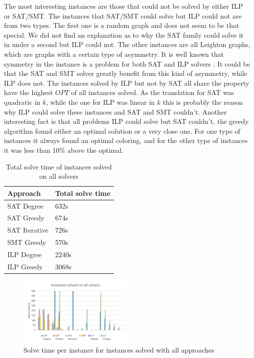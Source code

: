 \documentclass{sig-alternate}
\begin{document}
The most interesting instances are those that could not be solved by either ILP or SAT/SMT. 
The instances that SAT/SMT could solve but ILP could not are from two types.
The first one is a random graph and does not seem to be that special.
We did not find an explanation as to why the SAT family could solve it in under a second but ILP could not.
The other instances are all Leighton graphs, which are graphs with a certain type of asymmetry.
It is well known that symmetry in the instance is a problem for both SAT and ILP solvers \cite{ramani2004breaking}.
It could be that the SAT and SMT solver greatly benefit from this kind of asymmetry, while ILP does not.
The instances solved by ILP but not by SAT all share the property have the highest $OPT$ of all instances solved.
As the translation for SAT was quadratic in $k$, while the one for ILP was linear in $k$ this is probably the reason
why ILP could solve these instances and SAT and SMT couldn't.
Another interesting fact is that all problems ILP could solve but SAT couldn't, the greedy algorithm found either an optimal solution or a very close one.
For one type of instances it always found an optimal coloring, and for the other type of instances it was less than 10\% above the optimal.

\begin{table}
\begin{tabular}{ |l|l| }
\hline
Approach & Total solve time \\
\hline
SAT Degree &  632s \\
\hline
SAT Greedy & 674s \\
\hline
SAT Iterative & 726s \\
\hline
SMT Greedy & 570s \\
\hline
ILP Degree & 2240s \\
\hline
ILP Greedy &  3068s \\
\hline
\end{tabular}
\caption{Total solve time of instances solved on all solvers}
\label{table:gccombinations}
\end{table}

\begin{figure}
  \includegraphics[width=0.5\textwidth]{figures/solve_time_comparison}
  \caption{Solve time per instance for instances solved with all approaches}
  \label{fig:solvetimecomparison}
\end{figure}
\end{document}
